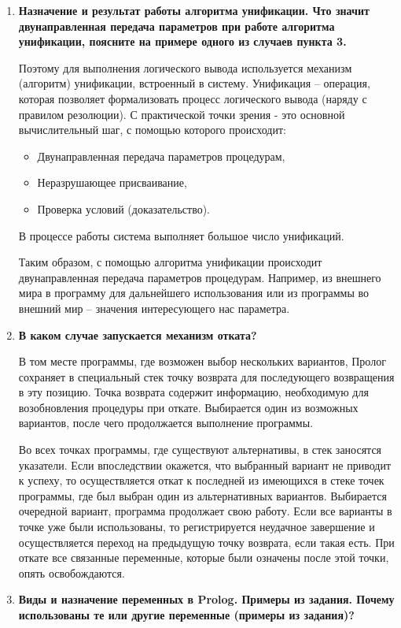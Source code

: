 \begin{enumerate}
    \item \textbf{Назначение и результат работы алгоритма унификации. Что значит двунаправленная передача параметров при работе алгоритма унификации, поясните на примере одного из случаев пункта  3.}

        Поэтому для выполнения логического вывода используется механизм (алгоритм) унификации, встроенный в систему. Унификация – операция, которая позволяет формализовать процесс логического вывода (наряду с правилом резолюции). С практической точки зрения - это основной вычислительный шаг, с помощью которого происходит:
        \begin{itemize}
            \item Двунаправленная передача параметров процедурам,
            \item Неразрушающее присваивание,
            \item Проверка условий (доказательство).
        \end{itemize}
        В процессе работы система выполняет большое число унификаций.

        Таким образом, с помощью алгоритма унификации происходит двунаправленная передача параметров процедурам. Например, из внешнего мира в программу для дальнейшего использования или из программы во внешний мир – значения интересующего нас параметра.

    \item \textbf{В каком случае запускается механизм отката?}

        В том месте программы, где возможен выбор нескольких вариантов, Пролог сохраняет в специальный стек точку возврата для последующего возвращения в эту позицию. Точка возврата содержит информацию, необходимую для возобновления процедуры при откате. Выбирается один из возможных вариантов, после чего продолжается выполнение программы.

Во всех точках программы, где существуют альтернативы, в стек заносятся указатели. Если впоследствии окажется, что выбранный вариант не приводит к успеху, то осуществляется откат к последней из имеющихся в стеке точек программы, где был выбран один из альтернативных вариантов. Выбирается очередной вариант, программа продолжает свою работу. Если все варианты в точке уже были использованы, то регистрируется неудачное завершение и осуществляется переход на предыдущую точку возврата, если такая есть. При откате все связанные переменные, которые были означены после этой точки, опять освобождаются.

    \item \textbf{Виды и назначение переменных в Prolog. Примеры из задания.  Почему использованы те или другие переменные (примеры из задания)?}


\end{enumerate}
